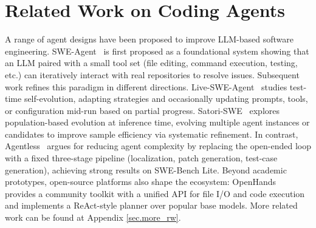 \section{Related Work on Coding Agents}

A range of agent designs have been proposed to improve LLM-based software engineering. SWE-Agent~\citep{sweagent} is first proposed as a foundational system showing that an LLM paired with a small tool set (file editing, command execution, testing, etc.) can iteratively interact with real repositories to resolve issues. Subsequent work refines this paradigm in different directions. Live-SWE-Agent~\citep{xia2025live} studies test-time self-evolution, adapting strategies and occasionally updating prompts, tools, or configuration mid-run based on partial progress. Satori-SWE~\citep{satoriswe} explores population-based evolution at inference time, evolving multiple agent instances or candidates to improve sample efficiency via systematic refinement. In contrast, Agentless~\citep{xia2024agentless} argues for reducing agent complexity by replacing the open-ended loop with a fixed three-stage pipeline (localization, patch generation, test-case generation), achieving strong results on SWE-Bench Lite. Beyond academic prototypes, open-source platforms also shape the ecosystem: OpenHands~\citep{openhands} provides a community toolkit with a unified API for file I/O and code execution and implements a ReAct-style planner over popular base models. More related work can be found at Appendix \ref{sec.more_rw}.
